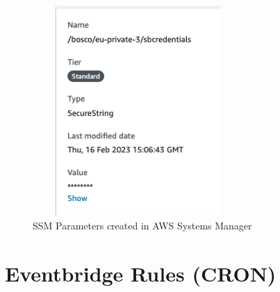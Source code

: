 \documentclass[12pt,a4paper,titlepage]{report}
\begin{document}
\begin{figure}[H]
 \centering
 \includegraphics[width=8cm,height=8cm,keepaspectratio]{./diagrams/ssm_params.png}
 \caption{SSM Parameters created in AWS Systems Manager}
\end{figure}

\section{Eventbridge Rules (CRON) }
\end{document}
